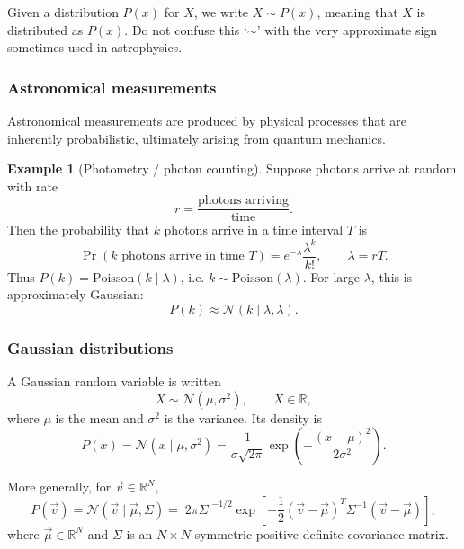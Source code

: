\documentclass[11pt, titlepage]{article} %
\numberwithin{equation}{section}
\theoremstyle{definition}
\newtheorem*{example*}{Example}
\numberwithin{assumption}{section}
\begin{document}
Given a distribution $P(x)$ for $X$, we write $X\sim P(x)$, meaning that $X$ is distributed as $P(x)$. Do not confuse this `$\sim$' with the very approximate sign sometimes used in astrophysics.

\subsubsection*{Astronomical measurements}

Astronomical measurements are produced by physical processes that are inherently probabilistic, ultimately arising from quantum mechanics.

\begin{example*}[Photometry / photon counting]
Suppose photons arrive at random with rate
\begin{equation*}
    r=\frac{\text{photons arriving}}{\text{time}}.
\end{equation*}
Then the probability that $k$ photons arrive in a time interval $T$ is
\begin{equation*}
    \Pr(\text{$k$ photons arrive in time }T)=e^{-\lambda}\frac{\lambda^k}{k!}, \qquad \lambda=rT.
\end{equation*}
Thus $P(k)=\mathrm{Poisson}(k\mid \lambda)$, i.e. $k\sim \mathrm{Poisson}(\lambda)$. For large $\lambda$, this is approximately Gaussian:
\begin{equation*}
    P(k)\approx \mathcal{N}(k\mid \lambda,\lambda).
\end{equation*}
\end{example*}

\subsubsection*{Gaussian distributions}

A Gaussian random variable is written
\begin{equation*}
    X\sim \mathcal{N}(\mu,\sigma^2), \qquad X\in \mathbb{R},
\end{equation*}
where $\mu$ is the mean and $\sigma^2$ is the variance. Its density is
\begin{equation*}
    P(x)=\mathcal{N}(x\mid \mu,\sigma^2)=\frac{1}{\sigma\sqrt{2\pi}}
    \exp\!\left(-\frac{(x-\mu)^2}{2\sigma^2}\right).
\end{equation*}

More generally, for $\vec v\in \mathbb{R}^N$,
\begin{equation*}
    P(\vec v)=\mathcal{N}(\vec v\mid \vec \mu,\Sigma)
    =|2\pi \Sigma|^{-1/2}
    \exp\!\left[-\frac12(\vec v-\vec \mu)^T\Sigma^{-1}(\vec v-\vec \mu)\right],
\end{equation*}
where $\vec\mu\in \mathbb{R}^N$ and $\Sigma$ is an $N\times N$ symmetric positive-definite covariance matrix.
\end{document}
